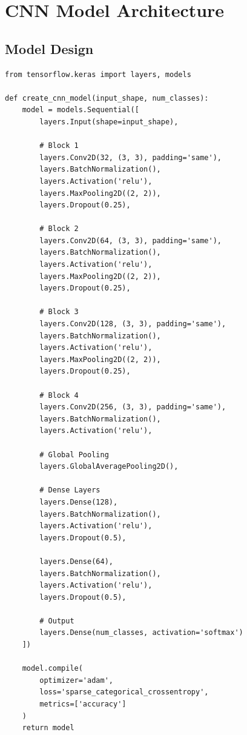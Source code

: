\documentclass[a4paper,12pt]{article}
\begin{document}
\section{CNN Model Architecture}

\subsection{Model Design}
\begin{lstlisting}[style=pythonstyle]
from tensorflow.keras import layers, models

def create_cnn_model(input_shape, num_classes):
    model = models.Sequential([
        layers.Input(shape=input_shape),
        
        # Block 1
        layers.Conv2D(32, (3, 3), padding='same'),
        layers.BatchNormalization(),
        layers.Activation('relu'),
        layers.MaxPooling2D((2, 2)),
        layers.Dropout(0.25),
        
        # Block 2
        layers.Conv2D(64, (3, 3), padding='same'),
        layers.BatchNormalization(),
        layers.Activation('relu'),
        layers.MaxPooling2D((2, 2)),
        layers.Dropout(0.25),
        
        # Block 3
        layers.Conv2D(128, (3, 3), padding='same'),
        layers.BatchNormalization(),
        layers.Activation('relu'),
        layers.MaxPooling2D((2, 2)),
        layers.Dropout(0.25),
        
        # Block 4
        layers.Conv2D(256, (3, 3), padding='same'),
        layers.BatchNormalization(),
        layers.Activation('relu'),
        
        # Global Pooling
        layers.GlobalAveragePooling2D(),
        
        # Dense Layers
        layers.Dense(128),
        layers.BatchNormalization(),
        layers.Activation('relu'),
        layers.Dropout(0.5),
        
        layers.Dense(64),
        layers.BatchNormalization(),
        layers.Activation('relu'),
        layers.Dropout(0.5),
        
        # Output
        layers.Dense(num_classes, activation='softmax')
    ])
    
    model.compile(
        optimizer='adam',
        loss='sparse_categorical_crossentropy',
        metrics=['accuracy']
    )
    return model
\end{lstlisting}
\end{document}
